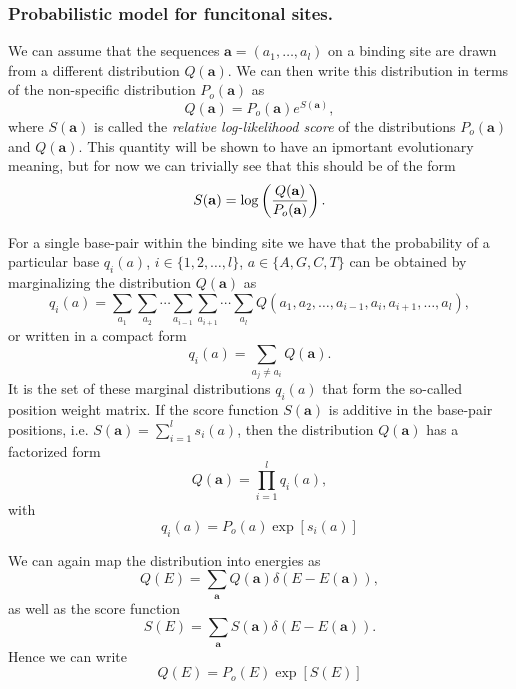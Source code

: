 \subsubsection{Probabilistic model for funcitonal sites.}

We can assume that the sequences $\mathbf{a} = (a_1, \ldots, a_l)$ on a binding
site are drawn from a different distribution $Q(\mathbf{a})$. We can then write
this distribution in terms of the non-specific distribution $P_o(\mathbf{a})$ as
\begin{equation}
  Q(\mathbf{a}) = P_o(\mathbf{a}) e^{S(\mathbf{a})},
\end{equation}
where $S(\mathbf{a})$ is called the {\it relative log-likelihood score} of the
distributions $P_o(\mathbf{a})$ and $Q(\mathbf{a})$. This quantity will be shown
to have an ipmortant evolutionary meaning, but for now we can trivially see that
this should be of the form
\begin{equation}
  S(\mathbf{a}) = \log \left( {Q(\mathbf{a}) \over P_o(\mathbf{a})} \right).
\end{equation}

For a single base-pair within the binding site we have that the probability of
a particular base $q_i(a)$, $i \in \{1, 2, \ldots, l\}$, $a \in \{A, G, C, T \}$
can be obtained by marginalizing the distribution $Q(\mathbf{a})$ as
\begin{equation}
  q_i(a) = \sum_{a_1} \sum_{a_2} \cdots \sum_{a_{i-1}}\sum_{a_{i+1}}
  \cdots \sum_{a_l} Q(a_1, a_2, \ldots, a_{i-1}, a_{i}, a_{i+1}, \ldots, a_l),
\end{equation}
or written in a compact form
\begin{equation}
  q_i(a) = \sum_{a_j \neq a_i} Q(\mathbf{a}).
\end{equation}
It is the set of these marginal distributions $q_i(a)$ that form the so-called
position weight matrix. If the score function $S(\mathbf{a})$ is additive in the
base-pair positions, i.e. $S(\mathbf{a}) = \sum_{i=1}^l s_i(a)$, then the
distribution $Q(\mathbf{a})$ has a factorized form
\begin{equation}
  Q(\mathbf{a}) = \prod_{i=1}^l q_i(a),
\end{equation}
with
\begin{equation}
  q_i(a) = P_o(a)\exp\left[ s_i(a) \right]
\end{equation}

We can again map the distribution into energies as
\begin{equation}
  Q(E) = \sum_{\mathbf{a}} Q(\mathbf{a}) \delta (E - E(\mathbf{a})),
\end{equation}
as well as the score function
\begin{equation}
  S(E) = \sum_{\mathbf{a}} S(\mathbf{a}) \delta (E - E(\mathbf{a})).
\end{equation}
Hence we can write
\begin{equation}
  Q(E) = P_o(E)\exp\left[ S(E) \right]
\end{equation}

